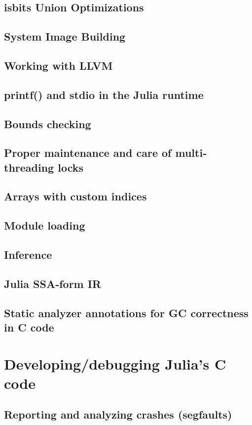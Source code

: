     \section{isbits Union Optimizations}
    \section{System Image Building}
    \section{Working with LLVM}
    \section{printf() and stdio in the Julia runtime}
    \section{Bounds checking}
    \section{Proper maintenance and care of multi-threading locks}
    \section{Arrays with custom indices}
    \section{Module loading}
    \section{Inference}
    \section{Julia SSA-form IR}
    \section{Static analyzer annotations for GC correctness in C code}
\chapter{Developing/debugging Julia's C code}
    \section{Reporting and analyzing crashes (segfaults)}
